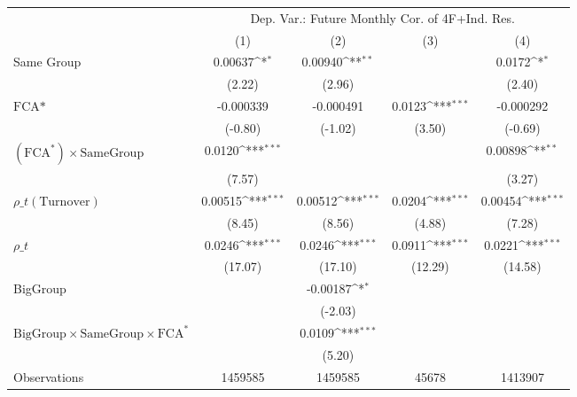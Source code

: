 {
\def\sym#1{\ifmmode^{#1}\else\(^{#1}\)\fi}
\begin{tabular}{l*{4}{c}}
\hline\hline
                &\multicolumn{4}{c}{Dep. Var.: Future Monthly Cor.  of 4F+Ind. Res.}        \\\cmidrule(lr){2-5}
                &\multicolumn{1}{c}{(1)}         &\multicolumn{1}{c}{(2)}         &\multicolumn{1}{c}{(3)}         &\multicolumn{1}{c}{(4)}         \\
\hline
Same Group      &  0.00637\sym{*}  &  0.00940\sym{**} &                  &   0.0172\sym{*}  \\
                &   (2.22)         &   (2.96)         &                  &   (2.40)         \\
[1em]
$ \text{FCA*} $ &-0.000339         &-0.000491         &   0.0123\sym{***}&-0.000292         \\
                &  (-0.80)         &  (-1.02)         &   (3.50)         &  (-0.69)         \\
[1em]
 $ (\text{FCA}^*) \times {\text{SameGroup} }  $ &   0.0120\sym{***}&                  &                  &  0.00898\sym{**} \\
                &   (7.57)         &                  &                  &   (3.27)         \\
[1em]
 $ {\rho\_t(\text{Turnover})} $ &  0.00515\sym{***}&  0.00512\sym{***}&   0.0204\sym{***}&  0.00454\sym{***}\\
                &   (8.45)         &   (8.56)         &   (4.88)         &   (7.28)         \\
[1em]
 $ {\rho\_t} $   &   0.0246\sym{***}&   0.0246\sym{***}&   0.0911\sym{***}&   0.0221\sym{***}\\
                &  (17.07)         &  (17.10)         &  (12.29)         &  (14.58)         \\
[1em]
BigGroup        &                  & -0.00187\sym{*}  &                  &                  \\
                &                  &  (-2.03)         &                  &                  \\
[1em]
$ {\text{BigGroup} } \times {\text{SameGroup} } \times \text{FCA}^* $ &                  &   0.0109\sym{***}&                  &                  \\
                &                  &   (5.20)         &                  &                  \\
\hline
Observations    &  1459585         &  1459585         &    45678         &  1413907         \\

\end{tabular}}
